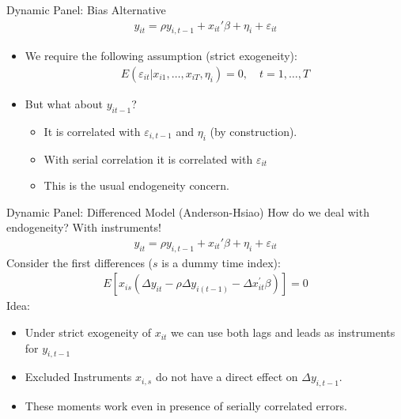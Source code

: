 \documentclass[xcolor=pdftex,dvipsnames,table,mathserif,aspectratio=169]{beamer}
\begin{document}
\begin{frame}{Dynamic Panel: Bias Alternative}
\begin{eqnarray*}
y_{it} = \rho y_{i,t-1} + x_{it}'\beta + \eta_i + \varepsilon_{it}
\end{eqnarray*}
\begin{itemize}
\item We require the following assumption (\alert{strict exogeneity}):
\begin{eqnarray*}
E\left(\varepsilon_{i t} | x_{i 1}, \ldots, x_{i T}, \eta_{i}\right)=0, \quad t=1, \ldots, T
\end{eqnarray*}
\item But what about $y_{it-1}$? 
\begin{itemize}
\item It is correlated with $\varepsilon_{i,t-1}$ and $\eta_i$ (by construction).
\item With serial correlation it is correlated with $\varepsilon_{it}$
\item This is the usual \alert{endogeneity} concern.
\end{itemize}
\end{itemize}
\end{frame}



\begin{frame}{Dynamic Panel: Differenced Model (Anderson-Hsiao)}
How do we deal with endogeneity? With \alert{instruments}!
\begin{eqnarray*}
y_{it} = \rho y_{i,t-1} + x_{it}'\beta + \eta_i + \varepsilon_{it}
\end{eqnarray*}
Consider the first differences ($s$ is a dummy time index):
\begin{eqnarray*}
E\left[x_{i s}\left(\Delta y_{i t}-\rho \Delta y_{i(t-1)}-\Delta x_{i t}^{\prime} \beta\right)\right]=0
\end{eqnarray*}
Idea:
\begin{itemize}
\item Under \alert{strict exogeneity} of $x_{it}$ we can use both \alert{lags} and \alert{leads} as instruments for $y_{i,t-1}$
\item \alert{Excluded Instruments} $x_{i,s}$ do not have a direct effect on $\Delta y_{i,t-1}$.
\item These moments work even in presence of \alert{serially correlated errors}.
\end{itemize}
\end{frame}
\end{document}
